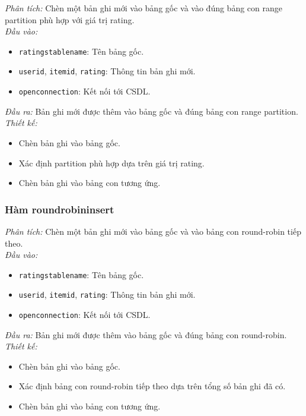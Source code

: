 \documentclass[a4paper]{article}
\begin{document}
\textit{Phân tích:}  
Chèn một bản ghi mới vào bảng gốc và vào đúng bảng con range partition phù hợp với giá trị rating.\\

\textit{Đầu vào:}
\begin{itemize}
    \item \texttt{ratingstablename}: Tên bảng gốc.
    \item \texttt{userid}, \texttt{itemid}, \texttt{rating}: Thông tin bản ghi mới.
    \item \texttt{openconnection}: Kết nối tới CSDL.\\
\end{itemize}

\textit{Đầu ra:}  
Bản ghi mới được thêm vào bảng gốc và đúng bảng con range partition.\\

\textit{Thiết kế:}
\begin{itemize}
    \item Chèn bản ghi vào bảng gốc.
    \item Xác định partition phù hợp dựa trên giá trị rating.
    \item Chèn bản ghi vào bảng con tương ứng.
\end{itemize}


\subsubsection{Hàm roundrobininsert}

\textit{Phân tích:}  
Chèn một bản ghi mới vào bảng gốc và vào bảng con round-robin tiếp theo.\\

\textit{Đầu vào:}
\begin{itemize}
    \item \texttt{ratingstablename}: Tên bảng gốc.
    \item \texttt{userid}, \texttt{itemid}, \texttt{rating}: Thông tin bản ghi mới.
    \item \texttt{openconnection}: Kết nối tới CSDL.\\
\end{itemize}

\textit{Đầu ra:}  
Bản ghi mới được thêm vào bảng gốc và đúng bảng con round-robin.\\

\textit{Thiết kế:}
\begin{itemize}
    \item Chèn bản ghi vào bảng gốc.
    \item Xác định bảng con round-robin tiếp theo dựa trên tổng số bản ghi đã có.
    \item Chèn bản ghi vào bảng con tương ứng.
\end{itemize}
\end{document}
